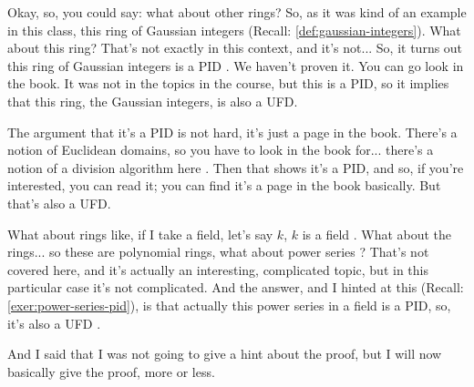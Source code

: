 \begin{speech}[00:02:17 - 00:03:57]
Okay, so, you could say: what about other rings? So, as it was kind of an example in this class, this ring of Gaussian integers  (Recall: \cref{def:gaussian-integers}). What about this ring? That's not exactly in this context, and it's not... So, it turns out this ring of Gaussian integers is a PID . We haven't proven it. You can go look in the book. It was not in the topics in the course, but this is a PID, so it implies that this ring, the Gaussian integers, is also a UFD.

The argument that it's a PID is not hard, it's just a page in the book. There's a notion of Euclidean domains, so you have to look in the book for... there's a notion of a division algorithm here . Then that shows it's a PID, and so, if you're interested, you can read it; you can find it's a page in the book basically. But that's also a UFD.

What about rings like, if I take a field, let's say $k$, $k$ is a field . What about the rings... so these are polynomial rings, what about power series ? That's not covered here, and it's actually an interesting, complicated topic, but in this particular case it's not complicated. And the answer, and I hinted at this (Recall: \cref{exer:power-series-pid}), is that actually this power series in a field is a PID, so, it's also a UFD .

And I said that I was not going to give a hint about the proof, but I will now basically give the proof, more or less.
\end{speech}

\begin{content}

\end{content}

